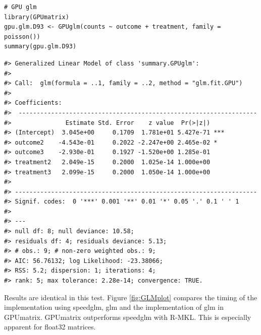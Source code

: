 \begin{verbatim}
# GPU glm
library(GPUmatrix)
gpu.glm.D93 <- GPUglm(counts ~ outcome + treatment, family = poisson())
summary(gpu.glm.D93)
\end{verbatim}

\begin{verbatim}
#> Generalized Linear Model of class 'summary.GPUglm':
#> 
#> Call:  glm(formula = ..1, family = ..2, method = "glm.fit.GPU") 
#> 
#> Coefficients:
#>  ------------------------------------------------------------------ 
#>               Estimate Std. Error    z value  Pr(>|z|)    
#> (Intercept)  3.045e+00     0.1709  1.781e+01 5.427e-71 ***
#> outcome2    -4.543e-01     0.2022 -2.247e+00 2.465e-02 *  
#> outcome3    -2.930e-01     0.1927 -1.520e+00 1.285e-01    
#> treatment2   2.049e-15     0.2000  1.025e-14 1.000e+00    
#> treatment3   2.099e-15     0.2000  1.050e-14 1.000e+00    
#> 
#> ------------------------------------------------------------------- 
#> Signif. codes:  0 '***' 0.001 '**' 0.01 '*' 0.05 '.' 0.1 ' ' 1 
#> 
#> ---
#> null df: 8; null deviance: 10.58;
#> residuals df: 4; residuals deviance: 5.13;
#> # obs.: 9; # non-zero weighted obs.: 9;
#> AIC: 56.76132; log Likelihood: -23.38066;
#> RSS: 5.2; dispersion: 1; iterations: 4;
#> rank: 5; max tolerance: 2.28e-14; convergence: TRUE.
\end{verbatim}

Results are identical in this test. Figure \ref{fig:GLMplot} compares the timing of the implementation using speedglm, glm and the implementation of glm in GPUmatrix. GPUmatrix outperforms speedglm with R-MKL. This is especially apparent for float32 matrices.

